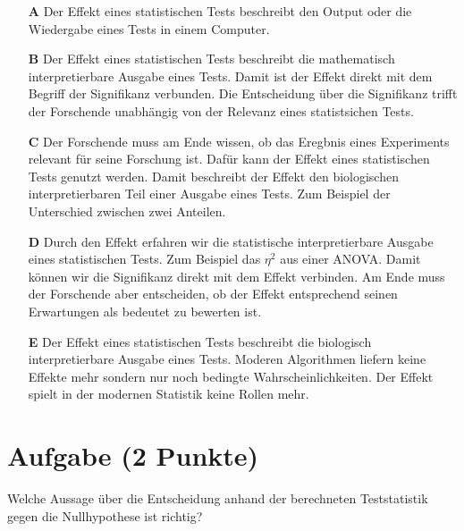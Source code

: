 \documentclass[a4paper, 9pt]{scrartcl}\usepackage[]{graphicx}\usepackage[]{xcolor}
\begin{document}
\begin{enumerate}
\item [\textbf{A} \msquare] Der Effekt eines statistischen Tests beschreibt den Output oder die Wiedergabe eines Tests in einem Computer.
\item [\textbf{B} \msquare] Der Effekt eines statistischen Tests beschreibt die mathematisch interpretierbare Ausgabe eines Tests. Damit ist der Effekt direkt mit dem Begriff der Signifikanz verbunden. Die Entscheidung über die Signifikanz trifft der Forschende unabhängig von der Relevanz eines statistsichen Tests.
\item [\textbf{C} \msquare] Der Forschende muss am Ende wissen, ob das Eregbnis eines Experiments relevant für seine Forschung ist. Dafür kann der Effekt eines statistischen Tests genutzt werden. Damit beschreibt der Effekt den biologischen interpretierbaren Teil einer Ausgabe eines Tests. Zum Beispiel der Unterschied zwischen zwei Anteilen.
\item [\textbf{D} \msquare] Durch den Effekt erfahren wir die statistische interpretierbare Ausgabe eines statistischen Tests. Zum Beispiel das $\eta^2$ aus einer ANOVA. Damit können wir die Signifikanz direkt mit dem Effekt verbinden. Am Ende muss der Forschende aber entscheiden, ob der Effekt entsprechend seinen Erwartungen als bedeutet zu bewerten ist.
\item [\textbf{E} \msquare] Der Effekt eines statistischen Tests beschreibt die biologisch interpretierbare Ausgabe eines Tests. Moderen Algorithmen liefern keine Effekte mehr sondern nur noch bedingte Wahrscheinlichkeiten. Der Effekt spielt in der modernen Statistik keine Rollen mehr.
\end{enumerate}

\section{Aufgabe \hfill (2 Punkte)}



Welche Aussage über die Entscheidung anhand der berechneten Teststatistik gegen die
Nullhypothese ist richtig?
\end{document}

